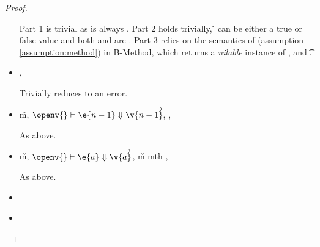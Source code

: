 \begin{lemma}
\begin{proof}
\begin{case}[T-MethodStatic]
\begin{itemize}
\begin{subcase}[B-Method]
Part 1 is trivial as \object{} is always \emptyobject{}.
Part 2 holds trivially, \v{} can be either a true or false value
and both {\thenprop{\prop{}}} and {\elseprop{\prop{}}}
are \topprop{}.
Part 3 relies on the semantics of \invokejavamethodliteral (assumption \ref{assumption:method})
in B-Method, which returns a \emph{nilable} instance of ,
and  {\t{}}.
\end{subcase}

  \item[]
\begin{subcase}[BE-Method1]
  \opsem {\openv{}}
         {}
         {\errorval{\v{}}},
  \opsem {\openv{}}
         {\e{}}
         {\errorval{\v{}}}

         Trivially reduces to an error.
\end{subcase}
  \item[]
\begin{subcase}[BE-Method2]
  \opsem {\openv{}}
         {}
         {\v{m}},
 $\overrightarrow{
  \opsem {\openv{}}
         {\e{n-1}}
         {\v{n-1}}
       }$,
  \opsem {\openv{}}
         {}
         {\errorval{\v{}}},
  \opsem {\openv{}}
         {\e{}}
         {\errorval{\v{}}}

  As above.
\end{subcase}
  \item[]
\begin{subcase}[BE-Method3]
  \opsem {\openv{}}
         {}
         {\v{m}},
  $\overrightarrow{
  \opsem {\openv{}}
         {\e{a}}
         {\v{a}}
       }$,
   {\v{m}} {mth}
                    {} {}
                    {}
                    {\errorvalv{}},
  \opsem {\openv{}} {\e{}} {\errorvalv{}}

  As above.

\end{subcase}
  \item[]
\begin{subcase}[BW-Method1]
\end{subcase}
  \item[]
\begin{subcase}[BW-Method2]
\end{subcase}
\end{itemize}

\end{case}


\end{proof}
\end{lemma}
